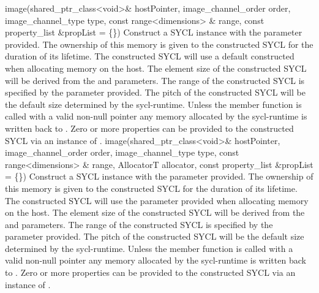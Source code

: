     \addRowFiveSL
    {image(shared_ptr_class<void>\& hostPointer, }
    { image_channel_order order, }
    { image_channel_type type, }
    { const range<dimensions> \& range, }
    { const property_list \&propList = \{\}) }
    {
         Construct a SYCL  instance with the  parameter provided. The ownership of this memory is given to the constructed SYCL  for the duration of its lifetime.
         The constructed SYCL  will use a default constructed  when allocating memory on the host.
         The element size of the constructed SYCL  will be derived from the  and  parameters.
         The range of the constructed SYCL  is specified by the  parameter provided.
         The pitch of the constructed SYCL  will be the default size determined by the \gls{sycl-runtime}.
         Unless the member function  is called with a valid non-null pointer any memory allocated by the \gls{sycl-runtime} is written back to .
         Zero or more properties can be provided to the constructed SYCL  via an instance of .
    }
    \addRowSixSL
    {image(shared_ptr_class<void>\& hostPointer, }
    { image_channel_order order, }
    { image_channel_type type, }
    { const range<dimensions> \& range, }
    { AllocatorT allocator, }
    { const property_list \&propList = \{\}) }
    {
         Construct a SYCL  instance with the  parameter provided. The ownership of this memory is given to the constructed SYCL  for the duration of its lifetime.
         The constructed SYCL  will use the  parameter provided when allocating memory on the host.
         The element size of the constructed SYCL  will be derived from the  and  parameters.
         The range of the constructed SYCL  is specified by the  parameter provided.
         The pitch of the constructed SYCL  will be the default size determined by the \gls{sycl-runtime}.
         Unless the member function  is called with a valid non-null pointer any memory allocated by the \gls{sycl-runtime} is written back to .
         Zero or more properties can be provided to the constructed SYCL  via an instance of .
    }    
